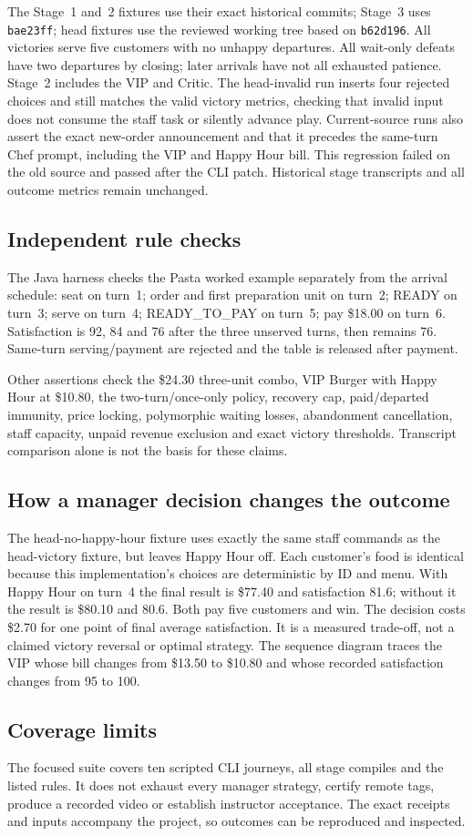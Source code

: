 The Stage~1 and~2 fixtures use their exact historical commits; Stage~3 uses
\texttt{bae23ff}; head fixtures use the reviewed working tree based on \texttt{b62d196}. All
victories serve five customers with no unhappy departures. All wait-only
defeats have two departures by closing; later arrivals have not all exhausted
patience. Stage~2 includes the VIP and Critic. The head-invalid run inserts
four rejected choices and still matches the valid victory metrics, checking
that invalid input does not consume the staff task or silently advance play.
Current-source runs also assert the exact new-order announcement and that it
precedes the same-turn Chef prompt, including the VIP and Happy Hour bill.
This regression failed on the old source and passed after the CLI patch.
Historical stage transcripts and all outcome metrics remain unchanged.

\subsection{Independent rule checks}
The Java harness checks the Pasta worked example separately from the arrival
schedule: seat on turn~1; order and first preparation unit on turn~2; READY on
turn~3; serve on turn~4; READY\_TO\_PAY on turn~5; pay \$18.00 on turn~6.
Satisfaction is 92, 84 and 76 after the three unserved turns, then remains 76.
Same-turn serving/payment are rejected and the table is released after payment.

Other assertions check the \$24.30 three-unit combo, VIP Burger with Happy Hour
at \$10.80, the two-turn/once-only policy, recovery cap, paid/departed immunity,
price locking, polymorphic waiting losses, abandonment cancellation, staff
capacity, unpaid revenue exclusion and exact victory thresholds. Transcript
comparison alone is not the basis for these claims.

\subsection{How a manager decision changes the outcome}
The head-no-happy-hour fixture uses exactly the same staff commands as the
head-victory fixture, but leaves Happy Hour off. Each customer's food is
identical because this implementation's choices are deterministic by ID and menu.
With Happy Hour on turn~4 the final result is \$77.40 and satisfaction 81.6;
without it the result is \$80.10 and 80.6. Both pay five customers and win.
The decision costs \$2.70 for one point of final average satisfaction. It is a
measured trade-off, not a claimed victory reversal or optimal strategy.
The sequence diagram traces the VIP whose bill changes from \$13.50 to
\$10.80 and whose recorded satisfaction changes from 95 to 100.

\subsection{Coverage limits}
The focused suite covers ten scripted CLI journeys, all stage compiles and the
listed rules. It does not exhaust every manager strategy, certify remote tags,
produce a recorded video or establish instructor acceptance. The exact receipts
and inputs accompany the project, so outcomes can be reproduced and inspected.
